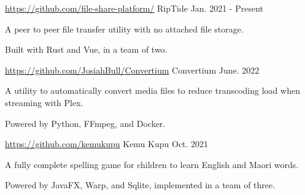 
\begin{cventries}
  \cventry
    {\href{https://google.com}{\faLink \space https://github.com/file-share-platform/}} %
    {RipTide} %
    {} %
    {Jan. 2021 - Present} %
    {
      \begin{cvitems} %
        \item {A peer to peer file transfer utility with no attached file storage.}
        \item {Built with Rust and Vue, in a team of two.}
      \end{cvitems}
    }

  \cventry
  {\href{https://google.com}{\faLink \space https://github.com/JosiahBull/Convertium}} %
  {Convertium} %
  {} %
  {June. 2022} %
  {
    \begin{cvitems} %
      \item {A utility to automatically convert media files to reduce transcoding load when streaming with Plex.}
      \item {Powered by Python, FFmpeg, and Docker.}
    \end{cvitems}
  }

  \cventry
    {\href{https://google.com}{\faLink \space https://github.com/kemukupu}} %
    {Kemu Kupu} %
    {} %
    {Oct. 2021} %
    {
      \begin{cvitems} %
        \item {A fully complete spelling game for children to learn English and Maori words.}
        \item {Powered by JavaFX, Warp, and Sqlite, implemented in a team of three.}
      \end{cvitems}
    }

\end{cventries}

